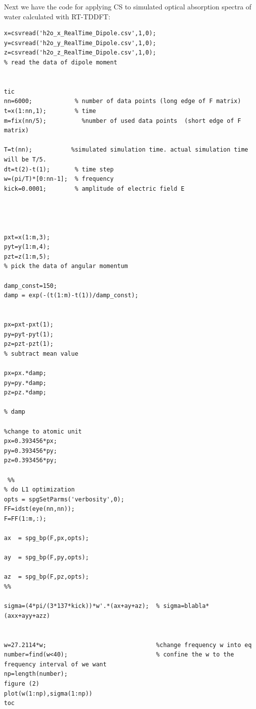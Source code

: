 \documentclass[11pt]{article}
\begin{document}
\begin{appendices}
\par Next we have the code for applying CS to simulated optical absorption spectra of water calculated with RT-TDDFT:

\begin{verbatim}
x=csvread('h2o_x_RealTime_Dipole.csv',1,0);
y=csvread('h2o_y_RealTime_Dipole.csv',1,0);
z=csvread('h2o_z_RealTime_Dipole.csv',1,0);
% read the data of dipole moment
 

tic
nn=6000;            % number of data points (long edge of F matrix)
t=x(1:nn,1);        % time
m=fix(nn/5);          %number of used data points  (short edge of F matrix)

T=t(nn);           %simulated simulation time. actual simulation time will be T/5.
dt=t(2)-t(1);       % time step
w=(pi/T)*[0:nn-1];  % frequency
kick=0.0001;        % amplitude of electric field E 

 

 
pxt=x(1:m,3);       
pyt=y(1:m,4);
pzt=z(1:m,5);
% pick the data of angular momentum
 
damp_const=150;
damp = exp(-(t(1:m)-t(1))/damp_const);

 
px=pxt-pxt(1);
py=pyt-pyt(1);
pz=pzt-pzt(1);
% subtract mean value

px=px.*damp;
py=py.*damp;
pz=pz.*damp;

% damp

%change to atomic unit
px=0.393456*px;
py=0.393456*py;
pz=0.393456*py;

 %% 
% do L1 optimization
opts = spgSetParms('verbosity',0); 
FF=idst(eye(nn,nn));
F=FF(1:m,:);
 
ax  = spg_bp(F,px,opts); 

ay  = spg_bp(F,py,opts); 

az  = spg_bp(F,pz,opts); 
%%
 
sigma=(4*pi/(3*137*kick))*w'.*(ax+ay+az);  % sigma=blabla*(axx+ayy+azz)

 
w=27.2114*w;                               %change frequency w into eq
number=find(w<40);                         % confine the w to the frequency interval of we want
np=length(number);                         
figure (2)
plot(w(1:np),sigma(1:np))
toc
\end{verbatim}



\end{appendices}
\end{document}
